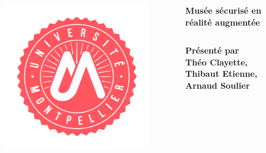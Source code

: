 \documentclass{beamer}
\begin{document}
    \begin{frame}[t]

        \begin{columns}[t]
            \begin{column}{.1\linewidth}
                \begin{figure}[t]
                    \includegraphics[width=\linewidth]{rsc/logo_um.png}
                \end{figure}
            \end{column}

            \begin{column}{.8\linewidth}
                \begin{block}{\Huge \centering \textbf{Musée sécurisé en réalité augmentée}}
                    \vspace{2em}
                    \begin{columns}[t]
                        \begin{column}{.5\linewidth}
                            \begin{center}
                                \textbf{Présenté par\\Théo Clayette, Thibaut Etienne, Arnaud Soulier}
                            \end{center}
                        \end{column}


\end{columns}
\end{block}
\end{column}
\end{columns}
\end{frame}
\end{document}
